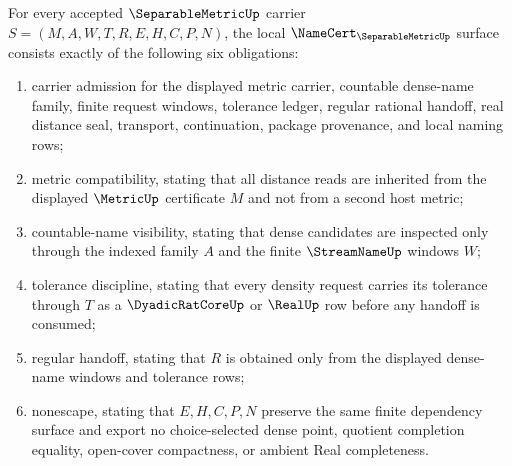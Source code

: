 \begin{theorem}
\label{thm:separable-metric-namecert-obligation-surface}
For every accepted $\SeparableMetricUp$ carrier $S=(M,A,W,T,R,E,H,C,P,N)$, the local $\NameCert_{\SeparableMetricUp}$ surface consists exactly of the following six obligations:
\begin{enumerate}
\item carrier admission for the displayed metric carrier, countable dense-name family, finite request windows, tolerance ledger, regular rational handoff, real distance seal, transport, continuation, package provenance, and local naming rows;
\item metric compatibility, stating that all distance reads are inherited from the displayed $\MetricUp$ certificate $M$ and not from a second host metric;
\item countable-name visibility, stating that dense candidates are inspected only through the indexed family $A$ and the finite $\StreamNameUp$ windows $W$;
\item tolerance discipline, stating that every density request carries its tolerance through $T$ as a $\DyadicRatCoreUp$ or $\RealUp$ row before any handoff is consumed;
\item regular handoff, stating that $R$ is obtained only from the displayed dense-name windows and tolerance rows;
\item nonescape, stating that $E,H,C,P,N$ preserve the same finite dependency surface and export no choice-selected dense point, quotient completion equality, open-cover compactness, or ambient Real completeness.
\end{enumerate}
\end{theorem}
